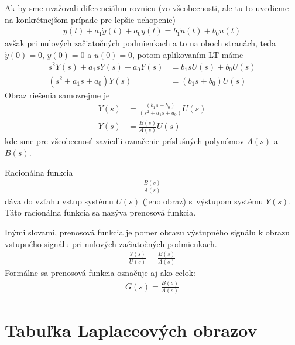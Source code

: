 \documentclass[a4paper, 10pt, ]{article}
\begin{document}
Ak by sme uvažovali diferenciálnu rovnicu (vo všeobecnosti, ale tu to uvedieme na konkrétnejšom prípade pre lepšie uchopenie)
\begin{align}
    \ddot y(t) + a_1 \dot y(t) + a_0 y(t) = b_1 \dot u(t) + b_0 u(t)
\end{align}
avšak pri nulových začiatočných podmienkach a to na oboch stranách, teda $\dot y(0) = 0$, $y(0) = 0$ a $u(0) = 0$, potom aplikovaním LT máme
\begin{align}
    s^2 Y(s)   + a_1 s Y(s)  + a_0 Y(s) &= b_1 s U(s) + b_0 U(s) \\
    (s^2   + a_1 s   + a_0) Y(s) &= (b_1 s  + b_0) U(s)
\end{align}
Obraz riešenia samozrejme je
\begin{align}
    Y(s) &= \frac{(b_1 s  + b_0)}{(s^2   + a_1 s   + a_0)} U(s) \\
    Y(s) &= \frac{B(s)}{A(s)} U(s)
\end{align}
kde sme pre všeobecnosť zaviedli označenie príslušných polynómov $A(s)$ a $B(s)$.

Racionálna funkcia
\begin{align}
    \frac{B(s)}{A(s)}
\end{align}
dáva do vzťahu vstup systému $U(s)$ (jeho obraz) s~výstupom systému $Y(s)$. Táto racionálna funkcia sa nazýva prenosová funkcia.

Inými slovami, prenosová funkcia je pomer obrazu výstupného signálu k obrazu vstupného signálu pri nulových začiatočných podmienkach.
\begin{align}
    \frac{Y(s)}{U(s)} = \frac{B(s)}{A(s)}
\end{align}
Formálne sa prenosová funkcia označuje aj ako celok:
\begin{align}
    G(s) = \frac{B(s)}{A(s)}
\end{align}




\newpage

\section{Tabuľka Laplaceových obrazov}
\label{Tabuľka Laplaceových obrazov}







\newcommand{\Laplace}[1]{\ensuremath{\mathcal{L}{\left\{#1\right\}}}}
\newcommand{\InvLap}[1]{\ensuremath{\mathcal{L}^{-1}{\left\{#1\right\}}}}
\end{document}
